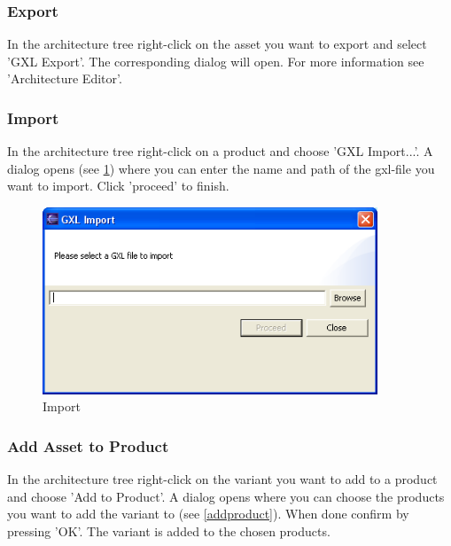 \subsubsection{Export}
In the architecture tree right-click on the asset you want to export and select
'GXL Export'. The corresponding dialog will open. For more information see
'Architecture Editor'.

\subsubsection{Import}
In the architecture tree right-click on a product and choose 'GXL Import...'. A dialog
opens (see \ref{import}) where you can enter the name and path of the gxl-file you want to import. Click 
'proceed' to finish.

\begin{figure}[h!]
\begin{center}
\includegraphics[width=10cm]{import.png}
   \caption{Import}
\label{import}
\end{center}
\end{figure}\par



\subsubsection{Add Asset to Product}
In the architecture tree right-click on the variant you want to add to a product
and choose 'Add to Product'. A dialog opens where you can choose the products you
want to add the variant to (see \ref{addproduct}). When done confirm by pressing
'OK'. The variant is added to the chosen products.


